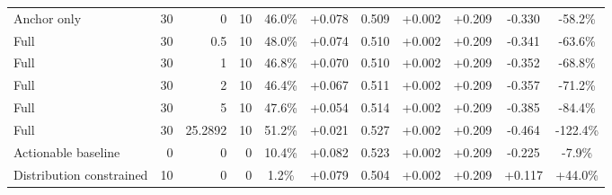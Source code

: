 \begin{table}[htbp]
\begin{tabular}{lrrrccccccc}
Anchor only & 30 & 0 & 10 & 46.0\% & +0.078 & 0.509 & +0.002 & +0.209 & -0.330 & -58.2\% \\
Full & 30 & 0.5 & 10 & 48.0\% & +0.074 & 0.510 & +0.002 & +0.209 & -0.341 & -63.6\% \\
Full & 30 & 1 & 10 & 46.8\% & +0.070 & 0.510 & +0.002 & +0.209 & -0.352 & -68.8\% \\
Full & 30 & 2 & 10 & 46.4\% & +0.067 & 0.511 & +0.002 & +0.209 & -0.357 & -71.2\% \\
Full & 30 & 5 & 10 & 47.6\% & +0.054 & 0.514 & +0.002 & +0.209 & -0.385 & -84.4\% \\
Full & 30 & 25.2892 & 10 & 51.2\% & +0.021 & 0.527 & +0.002 & +0.209 & -0.464 & -122.4\% \\
Actionable baseline & 0 & 0 & 0 & 10.4\% & +0.082 & 0.523 & +0.002 & +0.209 & -0.225 & -7.9\% \\
Distribution constrained & 10 & 0 & 0 & 1.2\% & +0.079 & 0.504 & +0.002 & +0.209 & +0.117 & +44.0\% \\
\bottomrule
\end{tabular}
\end{table}